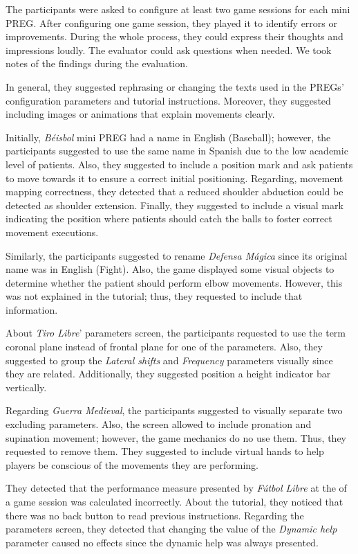 The participants were asked to configure at least two game sessions for each mini \ac{PREG}. After configuring one game session, they played it to identify errors or improvements. During the whole process, they could express their thoughts and impressions loudly. The evaluator could ask questions when needed. We took notes of the findings during the evaluation. 

In general, they suggested rephrasing or changing the texts used in the \acp{PREG}' configuration parameters and tutorial instructions. Moreover, they suggested including images or animations that explain movements clearly.

Initially, \textit{Béisbol} mini \ac{PREG} had a name in English (Baseball); however, the participants suggested to use the same name in Spanish due to the low academic level of patients. Also, they suggested to include a position mark and ask patients to move towards it to ensure a correct initial positioning. Regarding, movement mapping correctness, they detected that a reduced shoulder abduction could be detected as shoulder extension. Finally, they suggested to include a visual mark indicating the position where patients should catch the balls to foster correct movement executions.

Similarly, the participants suggested to rename \textit{Defensa M\'agica} since its original name was in English (Fight). Also, the game displayed some visual objects to determine whether the patient should perform elbow movements. However, this was not explained in the tutorial; thus, they requested to include that information.

About \textit{Tiro Libre}' parameters screen, the participants requested to use the term coronal plane instead of frontal plane for one of the parameters. Also, they suggested to group the \textit{Lateral shifts} and \textit{Frequency} parameters visually since they are related. Additionally, they suggested position a height indicator bar vertically.

Regarding \textit{Guerra Medieval}, the participants suggested to visually separate two excluding parameters. Also, the screen allowed to include pronation and supination movement; however, the game mechanics do no use them. Thus, they requested to remove them. They suggested to include virtual hands to help players be conscious of the movements they are performing.

They detected that the performance measure presented by \textit{F\'utbol Libre} at the of a game session was calculated incorrectly. About the tutorial, they noticed that there was no back button to read previous instructions. Regarding the parameters screen, they detected that changing the value of the \textit{Dynamic help} parameter caused no effects since the dynamic help was always presented.

